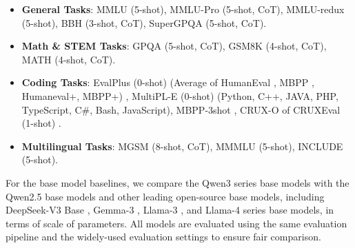 \documentclass[dvipsnames]{article}
\begin{document}
\begin{itemize}

\item \textbf{General Tasks}: MMLU \citep{mmlu} (5-shot), MMLU-Pro \citep{mmlupro} (5-shot, CoT), MMLU-redux \citep{mmluredux} (5-shot), BBH \citep{bbh} (3-shot, CoT), SuperGPQA \citep{supergpqa}(5-shot, CoT).

\item \textbf{Math \& STEM Tasks}: GPQA \citep{gpqa} (5-shot, CoT), GSM8K \citep{gsm8k} (4-shot, CoT), MATH \citep{math} (4-shot, CoT).

\item \textbf{Coding Tasks}: EvalPlus \citep{evalplus} (0-shot) (Average of HumanEval \citep{humaneval}, MBPP \citep{mbpp}, Humaneval+, MBPP+) \citep{evalplus}, MultiPL-E \citep{multiple} (0-shot) (Python, C++, JAVA, PHP, TypeScript, C\#, Bash, JavaScript), MBPP-3shot \citep{mbpp}, CRUX-O of CRUXEval (1-shot) \citep{gu2024cruxeval}.

\item \textbf{Multilingual Tasks}: MGSM \citep{mgsm} (8-shot, CoT), MMMLU \citep{mmmlu} (5-shot), INCLUDE \citep{romanou2024includeevaluatingmultilinguallanguage} (5-shot).

\end{itemize}

For the base model baselines, we compare the Qwen3 series base models with the Qwen2.5 base models \citep{qwen2.5} and other leading open-source base models, including DeepSeek-V3 Base \citep{deepseekv3}, Gemma-3 \citep{gemma3}, Llama-3 \citep{llama3}, and Llama-4 \citep{llama4} series base models, in terms of scale of parameters. All models are evaluated using the same evaluation pipeline and the widely-used evaluation settings to ensure fair comparison.
\end{document}
